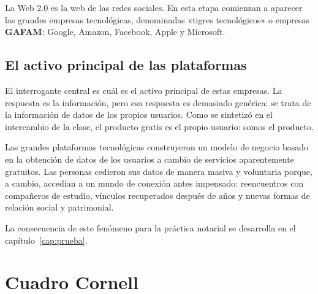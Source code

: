 \documentclass[12pt,oneside]{book}
\begin{document}
La Web 2.0 es la web de las redes sociales. En esta etapa comienzan a aparecer las grandes empresas tecnológicas, denominadas «tigres tecnológicos» o empresas \textbf{GAFAM}: Google, Amazon, Facebook, Apple y Microsoft.

\subsection{El activo principal de las plataformas}

El interrogante central es cuál es el activo principal de estas empresas. La respuesta es la información, pero esa respuesta es demasiado genérica: se trata de la información de datos de los propios usuarios. Como se sintetizó en el intercambio de la clase, el producto gratis es el propio usuario: somos el producto.

\begin{important}
Las grandes plataformas tecnológicas construyeron un modelo de negocio basado en la obtención de datos de los usuarios a cambio de servicios aparentemente gratuitos. Las personas cedieron sus datos de manera masiva y voluntaria porque, a cambio, accedían a un mundo de conexión antes impensado: reencuentros con compañeros de estudio, vínculos recuperados después de años y nuevas formas de relación social y patrimonial.
\end{important}

La consecuencia de este fenómeno para la práctica notarial se desarrolla en el capítulo~\ref{cap:prueba}.

\section{Cuadro Cornell}
\end{document}
